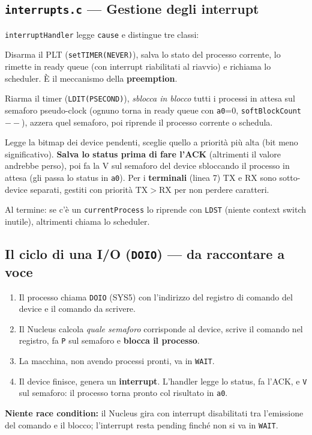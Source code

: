 \documentclass[11pt,a4paper]{article}
\newcommand{\code}[1]{\texttt{#1}}
\begin{document}
\subsection{\code{interrupts.c} --- Gestione degli interrupt}
\code{interruptHandler} legge \code{cause} e distingue tre classi:
\begin{description}[style=nextline,leftmargin=12pt]
\item[PLT (ExcCode 7) --- fine time slice] Disarma il PLT
  (\code{setTIMER(NEVER)}), salva lo stato del processo corrente, lo rimette in
  ready queue (con interrupt riabilitati al riavvio) e richiama lo scheduler.
  È il meccanismo della \textbf{preemption}.
\item[Interval Timer (ExcCode 3) --- pseudo-clock] Riarma il timer
  (\code{LDIT(PSECOND)}), \emph{sblocca in blocco} tutti i processi in attesa
  sul semaforo pseudo-clock (ognuno torna in ready queue con \code{a0}=0,
  \code{softBlockCount}$--$), azzera quel semaforo, poi riprende il processo
  corrente o schedula.
\item[Device (ExcCode 17--21) --- linee 3--7] Legge la bitmap dei device
  pendenti, sceglie quello a priorità più alta (bit meno significativo).
  \textbf{Salva lo status prima di fare l'ACK} (altrimenti il valore andrebbe
  perso), poi fa la V sul semaforo del device sbloccando il processo in attesa
  (gli passa lo status in \code{a0}). Per i \textbf{terminali} (linea 7) TX e RX
  sono sotto-device separati, gestiti con priorità TX$>$RX per non perdere
  caratteri.
\end{description}
Al termine: se c'è un \code{currentProcess} lo riprende con \code{LDST} (niente
context switch inutile), altrimenti chiama lo scheduler.

\subsection{Il ciclo di una I/O (\code{DOIO}) --- da raccontare a voce}
\begin{enumerate}
\item Il processo chiama \code{DOIO} (SYS5) con l'indirizzo del registro di
  comando del device e il comando da scrivere.
\item Il Nucleus calcola \emph{quale semaforo} corrisponde al device, scrive il
  comando nel registro, fa \code{P} sul semaforo e \textbf{blocca il processo}.
\item La macchina, non avendo processi pronti, va in \code{WAIT}.
\item Il device finisce, genera un \textbf{interrupt}. L'handler legge lo
  status, fa l'ACK, e \code{V} sul semaforo: il processo torna pronto col
  risultato in \code{a0}.
\end{enumerate}
\textbf{Niente race condition:} il Nucleus gira con interrupt disabilitati tra
l'emissione del comando e il blocco; l'interrupt resta pending finché non si va
in \code{WAIT}.
\end{document}
